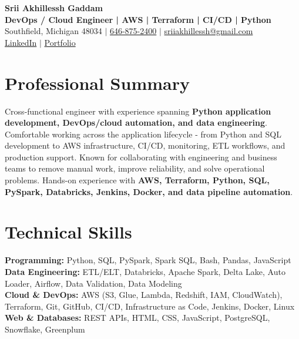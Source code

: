 \documentclass[letterpaper,10pt]{article}
\begin{document}
\fontsize{9.35pt}{10.45pt}\selectfont

\begin{center}
    {\LARGE \textbf{Srii Akhillessh Gaddam}} \\[-1pt]
    \textbf{DevOps / Cloud Engineer | AWS | Terraform | CI/CD | Python} \\[2pt]
    Southfield, Michigan 48034 $|$
    \href{tel:6468752400}{646-875-2400} $|$
    \href{mailto:sriiakhillessh@gmail.com}{sriiakhillessh@gmail.com} \\[1pt]
    \href{https://www.linkedin.com/in/srii-akhiilessh-gaddam-b48668191/}{LinkedIn} $|$
    \href{https://sriiakhillesshg.github.io/portfolio/}{Portfolio}
\end{center}
\vspace{-8pt}

\section{Professional Summary}
\small{Cross-functional engineer with experience spanning \textbf{Python application development, DevOps/cloud automation, and data engineering}. Comfortable working across the application lifecycle - from Python and SQL development to AWS infrastructure, CI/CD, monitoring, ETL workflows, and production support. Known for collaborating with engineering and business teams to remove manual work, improve reliability, and solve operational problems. Hands-on experience with \textbf{AWS, Terraform, Python, SQL, PySpark, Databricks, Jenkins, Docker, and data pipeline automation}.}

\section{Technical Skills}
\small{
\textbf{Programming:} Python, SQL, PySpark, Spark SQL, Bash, Pandas, JavaScript \\
\textbf{Data Engineering:} ETL/ELT, Databricks, Apache Spark, Delta Lake, Auto Loader, Airflow, Data Validation, Data Modeling \\
\textbf{Cloud \& DevOps:} AWS (S3, Glue, Lambda, Redshift, IAM, CloudWatch), Terraform, Git, GitHub, CI/CD, Infrastructure as Code, Jenkins, Docker, Linux \\
\textbf{Web \& Databases:} REST APIs, HTML, CSS, JavaScript, PostgreSQL, Snowflake, Greenplum
}
\end{document}
